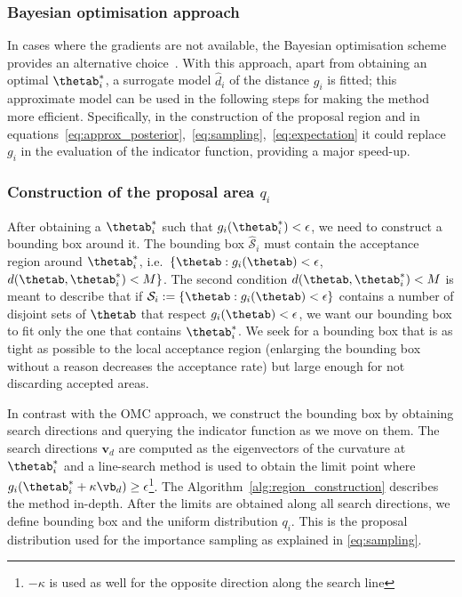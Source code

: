 \subsubsection*{Bayesian optimisation approach}
\label{subsubsec:GP_approach}

In cases where the gradients are not available, the Bayesian
optimisation scheme provides an alternative
choice~\cite{Shahriari2016}. With this approach, apart from
obtaining an optimal $\thetab_i^* $, a surrogate model $\hat{d}_i$ of
the distance $g_i$ is fitted; this approximate model can be used in
the following steps for making the method more
efficient. Specifically, in the construction of the proposal region
and in
equations~\eqref{eq:approx_posterior},~\eqref{eq:sampling},~\eqref{eq:expectation}
it could replace $g_i$ in the evaluation of the indicator
function, providing a major speed-up.

\subsubsection*{Construction of the proposal area $q_i$}

After obtaining a $\thetab_i^*$ such that
$g_i(\thetab_i^*) < \epsilon$, we need to construct a bounding box
around it. The bounding box $\mathcal{\hat{S}}_i$ must contain the
acceptance region around $\thetab_i^*$, i.e.\
$\{ \thetab : g_i(\thetab) < \epsilon$,
$d(\thetab, \thetab_i^*) < M \}$. The second condition
$d(\thetab, \thetab_i^*) < M$ is meant to describe that if
$\mathcal{S}_i := \{ \thetab : g_i(\thetab) < \epsilon \} $ contains a
number of disjoint sets of $\thetab$ that respect
$g_i(\thetab) < \epsilon$, we want our bounding box to fit only the
one that contains $\thetab_i^*$. We seek for a bounding box that is as
tight as possible to the local acceptance region (enlarging the
bounding box without a reason decreases the acceptance rate) but large
enough for not discarding accepted areas.

In contrast with the OMC approach, we construct the bounding box by
obtaining search directions and querying the indicator function as we move on them. The
search directions $\mathbf{v}_d$ are computed as the eigenvectors of
the curvature at $\thetab_i^*$ and a line-search method is used to
obtain the limit point where
$g_i(\thetab_i^* + \kappa \vb_d) \geq
\epsilon$\footnote{$-\kappa$ is used as well for the opposite direction along the search line}. The Algorithm~\ref{alg:region_construction} describes the method in-depth. After the limits are obtained along all
search directions, we define bounding box and the uniform distribution $q_i$. This is the proposal distribution used for the importance
sampling as explained in \eqref{eq:sampling}.


